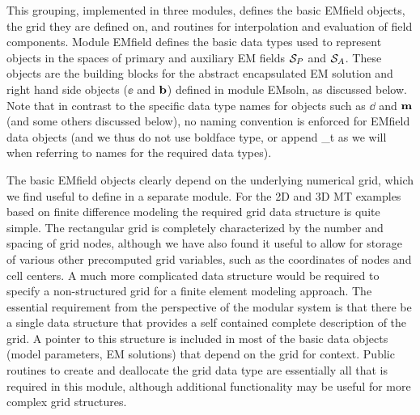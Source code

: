 This grouping, implemented in three modules,
defines the basic EMfield objects, 
the grid they are defined on, and routines for
interpolation and evaluation of field components.
Module EMfield defines the basic data types used to
represent objects in the spaces of primary and auxiliary 
EM fields ${\cal S}_P$ and ${\cal S}_A$.
These objects
are the building blocks for the abstract encapsulated
EM solution and right hand side objects ($\ee$ and ${\bf b}$) defined
in module EMsoln, as discussed below.  
Note that in contrast to the specific data type names for objects
such as $\dd$ and ${\bf m}$ (and some others discussed below),
no naming convention is enforced for EMfield data objects (and
we thus do not use boldface type, or append \_t as we will
when referring to names for the required data types).

The basic EMfield objects clearly depend on the underlying numerical grid,
which we find useful to define in a separate module.
For the 2D and 3D MT examples based on finite difference modeling
the required grid data structure is quite simple.
The rectangular grid is completely characterized by 
the number and spacing of grid nodes, although we have
also found it useful to allow for storage of various other
precomputed grid variables, such as the 
coordinates of nodes and cell centers.  
A much more complicated data structure would be required to
specify a non-structured grid for a finite element modeling approach.
The essential requirement from the perspective
of the modular system is that there be a single data structure
that provides a
self contained complete description of the grid.
A pointer to this structure is included in most of the basic data objects
(model parameters, EM solutions) that depend on the grid for context.
Public routines to create and deallocate the grid data type
are essentially all that is required in this module,
although additional functionality may be useful for
more complex grid structures.


